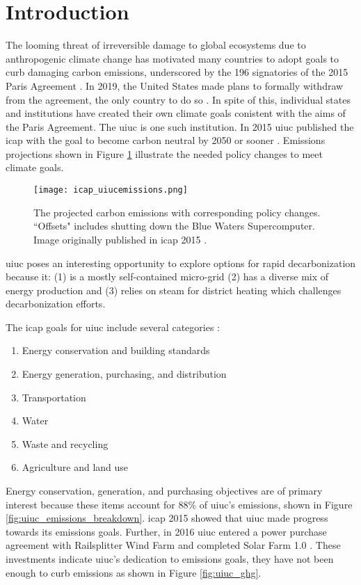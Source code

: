 \section{Introduction}

The looming threat of irreversible damage to global ecosystems due to
anthropogenic climate change has motivated many countries to adopt goals to
curb damaging carbon emissions, underscored by the 196 signatories of the 2015
Paris Agreement \cite{noauthor_paris_nodate}. In 2019, the United States made
plans to formally withdraw from the agreement, the only country to do so
\cite{eshraghi_us_2018}. In spite of
this, individual states and institutions have created their own climate goals
conistent with the aims of the Paris Agreement. The \gls{uiuc} is one such
institution. In 2015 \gls{uiuc} published the \gls{icap} with the goal to
become carbon neutral by 2050 or sooner \cite{isee_illinois_2015}. Emissions
projections shown in Figure \ref{fig:icap_emissions} illustrate the needed
policy changes to meet climate goals.

\begin{figure}[h]
  \centering
  \texttt{[image: icap\_uiucemissions.png]}
  \caption{The projected carbon emissions with corresponding policy changes.
  ``Offsets" includes shutting down the Blue Waters Supercomputer. Image
  originally published in \gls{icap} 2015 \cite{isee_illinois_2015}.}
  \label{fig:icap_emissions}
\end{figure}

\gls{uiuc} poses an interesting opportunity to explore options for rapid
decarbonization because it: (1) is a mostly self-contained micro-grid (2) has a
diverse mix of energy production and (3) relies on steam for district heating
which challenges decarbonization efforts.


The \gls{icap} goals for \gls{uiuc} include several categories
\cite{isee_illinois_2015}:
\begin{enumerate}
  \item Energy conservation and building standards
  \item Energy generation, purchasing, and distribution
  \item Transportation
  \item Water
  \item Waste and recycling
  \item Agriculture and land use
\end{enumerate}

Energy conservation, generation, and purchasing objectives are of primary
interest because these items account for 88\% of \gls{uiuc}'s emissions, shown
in Figure \ref{fig:uiuc_emissions_breakdown}. \gls{icap} 2015 showed that
\gls{uiuc} made progress towards its emissions goals. Further, in 2016
\gls{uiuc} entered a power purchase agreement with Railsplitter Wind Farm
\cite{breitweiser_wind_2016} and completed Solar Farm 1.0
\cite{white_solar_2017}. These investments indicate \gls{uiuc}'s dedication to
emissions goals, they have not been enough to curb emissions as shown in Figure
\ref{fig:uiuc_ghg}.

